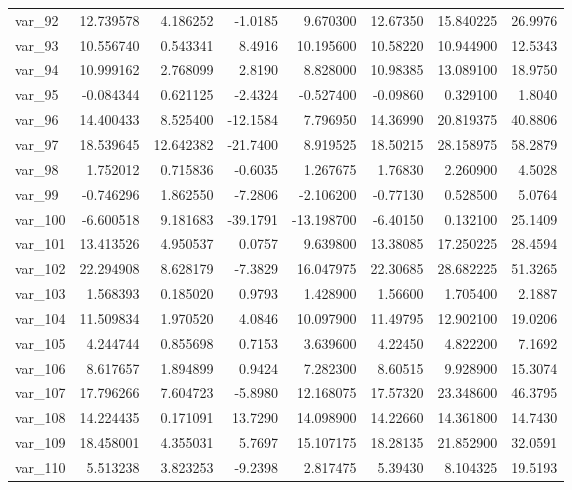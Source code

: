 ﻿\documentclass[12pt]{article}
\begin{document}
\begin{longtable}{lrrrrrrr}
  var\_92 &  12.739578 &   4.186252 &  -1.0185 &   9.670300 &  12.67350 &  15.840225 &  26.9976 \\
  var\_93 &  10.556740 &   0.543341 &   8.4916 &  10.195600 &  10.58220 &  10.944900 &  12.5343 \\
  var\_94 &  10.999162 &   2.768099 &   2.8190 &   8.828000 &  10.98385 &  13.089100 &  18.9750 \\
  var\_95 &  -0.084344 &   0.621125 &  -2.4324 &  -0.527400 &  -0.09860 &   0.329100 &   1.8040 \\
  var\_96 &  14.400433 &   8.525400 & -12.1584 &   7.796950 &  14.36990 &  20.819375 &  40.8806 \\
  var\_97 &  18.539645 &  12.642382 & -21.7400 &   8.919525 &  18.50215 &  28.158975 &  58.2879 \\
  var\_98 &   1.752012 &   0.715836 &  -0.6035 &   1.267675 &   1.76830 &   2.260900 &   4.5028 \\
  var\_99 &  -0.746296 &   1.862550 &  -7.2806 &  -2.106200 &  -0.77130 &   0.528500 &   5.0764 \\
 var\_100 &  -6.600518 &   9.181683 & -39.1791 & -13.198700 &  -6.40150 &   0.132100 &  25.1409 \\
 var\_101 &  13.413526 &   4.950537 &   0.0757 &   9.639800 &  13.38085 &  17.250225 &  28.4594 \\
 var\_102 &  22.294908 &   8.628179 &  -7.3829 &  16.047975 &  22.30685 &  28.682225 &  51.3265 \\
 var\_103 &   1.568393 &   0.185020 &   0.9793 &   1.428900 &   1.56600 &   1.705400 &   2.1887 \\
 var\_104 &  11.509834 &   1.970520 &   4.0846 &  10.097900 &  11.49795 &  12.902100 &  19.0206 \\
 var\_105 &   4.244744 &   0.855698 &   0.7153 &   3.639600 &   4.22450 &   4.822200 &   7.1692 \\
 var\_106 &   8.617657 &   1.894899 &   0.9424 &   7.282300 &   8.60515 &   9.928900 &  15.3074 \\
 var\_107 &  17.796266 &   7.604723 &  -5.8980 &  12.168075 &  17.57320 &  23.348600 &  46.3795 \\
 var\_108 &  14.224435 &   0.171091 &  13.7290 &  14.098900 &  14.22660 &  14.361800 &  14.7430 \\
 var\_109 &  18.458001 &   4.355031 &   5.7697 &  15.107175 &  18.28135 &  21.852900 &  32.0591 \\
 var\_110 &   5.513238 &   3.823253 &  -9.2398 &   2.817475 &   5.39430 &   8.104325 &  19.5193 \\

\end{longtable}
\end{document}
